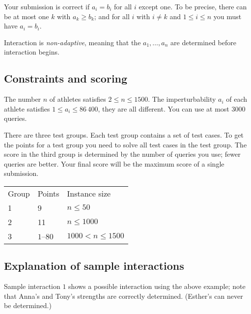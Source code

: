 Your submission is correct if $a_i=b_i$ for all $i$ except one.
To be precise, there can be at most one $k$ with $a_k\geq b_k$;
and for all $i$ with $i\neq k$ and $1\leq i\leq n$ you must have $a_i=b_i$.

Interaction is \emph{non-adaptive}, meaning that the $a_1,\ldots, a_n$ are determined before interaction begins.

\subsection*{Constraints and scoring}

The number $n$ of athletes satisfies $2\leq n\leq 1500$.
The imperturbability $a_i$ of each athlete satisfies $1\leq a_i\leq 86\,400$, they are all different.
You can use at most $3000$ queries.

There are three test groups.
Each test group contains a set of test cases. 
To get the points for a test group you need to solve all test cases in the test group.
The score in the third group is determined by the number of queries you use;
fewer queries are better.
Your final score will be the maximum score of a single submission.

\medskip
\begin{tabular}{lll}
Group & Points & Instance size\\
1  &  9 & $n\leq 50$\\
2  &  11 & $n\leq 1000$\\
3  &  $1$--$80$ & $1000 < n\leq 1500$\\
\end{tabular}

\subsection*{Explanation of sample interactions}


Sample interaction $1$ shows a possible interaction using the above example; note that Anna's and Tony's strengths are correctly determined.
(Esther's can never be determined.)

